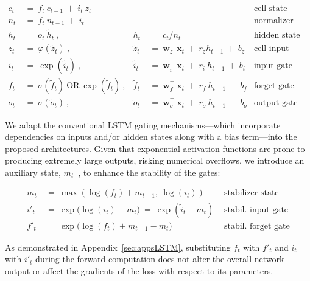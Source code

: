 \begin{align}
\label{eq:slstmforward}
c_t \ &= \  f_t \ c_{t-1} \ + \ i_t \ z_t & & 
 &\text{cell state} \\
n_t \ &= \  f_t \ n_{t-1} \ + \ i_t  & & 
 &\text{normalizer state} \\
h_t \ &= \ o_t \ \tilde{h}_t \ , 
  &\tilde{h}_t \ &= \ c_t / n_t
&\text{hidden state} \\
z_t \ &= \ \varphi \left( \tilde{z}_t \right) \ , 
  &\tilde{z}_t \ &=  \ \mathbf{w}^\top_{z} \ \mathbf{x}_t \ + \
  r_{z}  h_{t-1} \ + \  b_{z}
  &\text{cell input} \\
i_t \ &= \ \!\exp \left( \tilde{i}_t  \right) \ , 
  &\tilde{i}_t \ &= \ \mathbf{w}^\top_{i} \ \mathbf{x}_t \ + \
  r_{i}  \ h_{t-1} \ + \  b_{i}
  &\text{input gate} \\
f_t \ &= \ \sigma \left(  \tilde{f}_t \right) \ \text{OR} \
\!\exp \left(  \tilde{f}_t \right) \ ,
  &\tilde{f}_t \ &= \ \mathbf{w}^\top_{f} \ \mathbf{x}_t  \ + \
  r_{f}  \ h_{t-1} \ + \  b_{f}
  &\text{forget gate} \\
o_t \ &= \ \sigma \left( \tilde{o}_t \right) \ , 
  &\tilde{o}_t  \ &= \ \mathbf{w}^\top_{o} \ \mathbf{x}_t \ + \
  r_{o}  \ h_{t-1} \ + \  b_{o}
  &\text{output gate} 
\end{align}

We adapt the conventional LSTM gating mechanisms—which incorporate dependencies on inputs and/or hidden states along with a bias term—into the proposed architectures. Given that exponential activation functions are prone to producing extremely large outputs, risking numerical overflows, we introduce an auxiliary state, \mbox{$m_t$~\citep{Milakov:18arxiv}}, to enhance the stability of the gates:

\begin{align}
\label{eq:slstmstabil}
m_t \ &= \ \max \left( \log ( f_t ) + m_{t-1},\ \log ( i_t ) \right) &\text{stabilizer state} \\
i'_t \ &= \ \!\exp \big( \log ( i_t ) - m_t \big) \ = \ \!\exp \left( \tilde{i}_t - m_t \right) \ \, 
  &\text{stabil. input gate} \\
f'_t \ &= \ \!\exp \big( \log ( f_t ) + m_{t-1} - m_t \big) \ 
  &\text{stabil. forget gate}
\end{align}

As demonstrated in Appendix~\ref{sec:appsLSTM}, substituting $f_t$ with $f'_t$ and $i_t$ with $i'_t$ during the forward computation does not alter the overall network output or affect the gradients of the loss with respect to its parameters.

